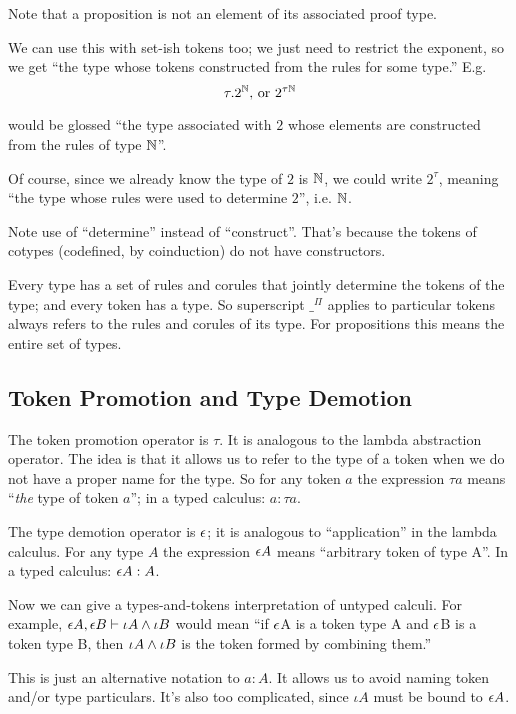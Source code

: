 \documentclass{article}
\begin{document}
Note that a proposition is not an element of its associated proof
type.

We can use this with set-ish tokens too; we just need to restrict the
exponent, so we get ``the type whose tokens constructed from the rules
for some type.''  E.g.
\[\tau.2^{\mathbb{N}}\text{, or } 2^{\tau\mathbb{N}}\]

would be glossed ``the type associated with \(2\) whose elements are
constructed from the rules of type \(\mathbb{N}\)''.

Of course, since we already know the type of \(2\) is \(\mathbb{N}\), we
could write \(2^{\tau}\), meaning ``the type whose rules were used to
determine \(2\)'', i.e. \(\mathbb{N}\).

Note use of ``determine'' instead of ``construct''. That's because the
tokens of cotypes (codefined, by coinduction) do not have
constructors.

Every type has a set of rules and corules that jointly determine the
tokens of the type; and every token has a type. So superscript
\(\_^{\Pi}\) applies to particular tokens always refers to the rules
and corules of its type. For propositions this means the entire set of
types.

\subsection{Token Promotion and Type Demotion}

The token promotion operator is \(\tau\).  It is analogous to the
lambda abstraction operator. The idea is that it allows us to refer
to the type of a token when we do not have a proper name for the type.
So for any token \(a\) the expression \(\tau a\) means ``\textit{the} type of
token \(a\)''; in a typed calculus: \(a: \tau a\).

The type demotion operator is \(\epsilon\); it is analogous to
``application'' in the lambda calculus. For any type \(A\) the
expression \(\epsilon A\) means ``arbitrary token of type A''. In a
typed calculus: \(\epsilon A: A\).

Now we can give a types-and-tokens interpretation of untyped calculi.
For example, \(\epsilon A, \epsilon B\vdash \iota A\land \iota B\) would
mean ``if \(\epsilon\)A is a token type A and \(\epsilon\)B is a token
type B, then \(\iota A \land\iota B\) is the token formed by
combining them.''

This is just an alternative notation to \(a:A\). It allows us to avoid
naming token and/or type particulars. It's also too complicated, since
\(\iota A\) must be bound to \(\epsilon A\).
\end{document}
